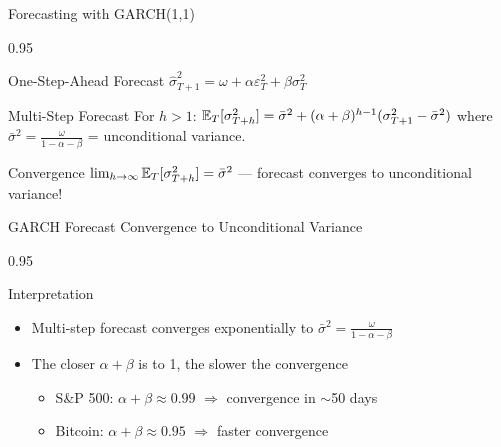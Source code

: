 \documentclass[9pt, aspectratio=169, t]{beamer}
\begin{document}
\begin{frame}{Forecasting with GARCH(1,1)}
    \begin{cminipage}{0.95\textwidth}
    \small
    \begin{block}{One-Step-Ahead Forecast}
        $\hat{\sigma}_{T+1}^2 = \omega + \alpha \varepsilon_T^2 + \beta \sigma_T^2$
    \end{block}

    \begin{block}{Multi-Step Forecast}
        For $h > 1$: $\mathbb{E}_T[\sigma_{T+h}^2] = \bar{\sigma}^2 + (\alpha + \beta)^{h-1} (\sigma_{T+1}^2 - \bar{\sigma}^2)$
        where $\bar{\sigma}^2 = \frac{\omega}{1 - \alpha - \beta}$ = unconditional variance.
    \end{block}

    \vspace{0.2cm}

    \begin{exampleblock}{Convergence}
        $\lim_{h \to \infty} \mathbb{E}_T[\sigma_{T+h}^2] = \bar{\sigma}^2$ --- forecast converges to unconditional variance!
    \end{exampleblock}
    \end{cminipage}
\end{frame}

\begin{frame}{GARCH Forecast Convergence to Unconditional Variance}
    \begin{cminipage}{0.95\textwidth}
    {\small
    \begin{block}{Interpretation}
            \begin{itemize}\setlength{\itemsep}{0pt}
                \item Multi-step forecast converges exponentially to $\bar{\sigma}^2 = \frac{\omega}{1-\alpha-\beta}$
                \item The closer $\alpha + \beta$ is to 1, the slower the convergence
                    \begin{itemize}\setlength{\itemsep}{0pt}
                        \item S\&P 500: $\alpha + \beta \approx 0.99$ $\Rightarrow$ convergence in $\sim$50 days
                        \item Bitcoin: $\alpha + \beta \approx 0.95$ $\Rightarrow$ faster convergence
                    \end{itemize}
            \end{itemize}
        \end{block}
    }
    \end{cminipage}
\end{frame}
\end{document}
